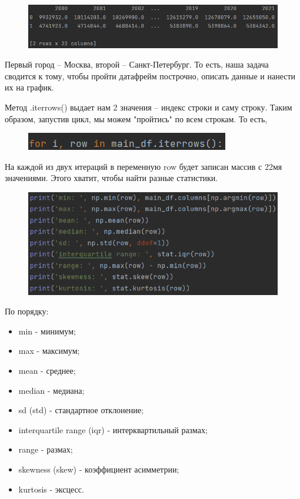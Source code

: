\begin{figure}[H]
	\begin{center}
		\includegraphics{include/fig/cleardf}
	\end{center}
\end{figure}

Первый город -- Москва, второй -- Санкт-Петербург. То есть, наша задача сводится к тому, чтобы пройти датафрейм построчно, описать данные и нанести их на график.

Метод .iterrows() выдает нам 2 значения -- индекс строки и саму строку. Таким образом, запустив цикл, мы можем "пройтись" по всем строкам. То есть,

\begin{figure}[H]
	\begin{center}
		\includegraphics{include/fig/iterrows}
	\end{center}
\end{figure}

На каждой из двух итераций в переменную row будет записан массив с 22мя значениями. Этого хватит, чтобы найти разные статистики.

\begin{figure}[H]
	\begin{center}
		\includegraphics{include/fig/describe}
	\end{center}
\end{figure}

По порядку:
\begin{itemize}
	\item min - минимум;
	\item max - максимум;
	\item mean - среднее;
	\item median - медиана;
	\item sd (std) - стандартное отклонение;
	\item interquartile range (iqr) - интерквартильный размах;
	\item range - размах;
	\item skewness (skew) - коэффициент асимметрии;
	\item kurtosis - эксцесс.
\end{itemize}

\newpage

